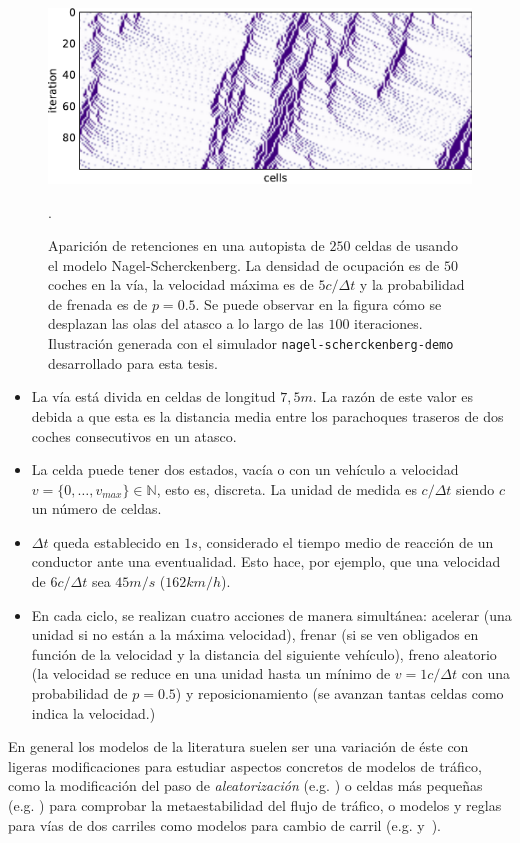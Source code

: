 \begin{figure}
	\centering
	\includegraphics{images/nagel-schreck}
	\caption{Aparición de retenciones en una autopista de $250$ celdas de usando el modelo Nagel-Scherckenberg. La densidad de ocupación es de $50$ coches en la vía, la velocidad máxima es de $5 c/\Delta t$ y la probabilidad de frenada es de $p = 0.5$. Se puede observar en la figura cómo se desplazan las olas del atasco a lo largo de las $100$ iteraciones. Ilustración generada con el simulador \texttt{nagel-scherckenberg-demo} desarrollado para esta tesis.}
	\label{fig:nagel-schreck}
.\end{figure}

\begin{itemize}
	\item La vía está divida en celdas de longitud $7,5m$. La razón de este valor es debida a que esta es la distancia media entre los parachoques traseros de dos coches consecutivos en un atasco.
	\item La celda puede tener dos estados, vacía o con un vehículo a velocidad $v = \{0, \ldots, v_{max}\} \in \mathbb{N}$, esto es, discreta. La unidad de medida es $c/\Delta t$ siendo $c$ un número de celdas.
	\item $\Delta t$ queda establecido en $1s$, considerado el tiempo medio de reacción de un conductor ante una eventualidad. Esto hace, por ejemplo, que una velocidad de $6 c/\Delta t$ sea $45 m/s$ ($162 km/h$).
	\item En cada ciclo, se realizan cuatro acciones de manera simultánea: acelerar (una unidad si no están a la máxima velocidad), frenar (si se ven obligados en función de la velocidad y la distancia del siguiente vehículo), freno aleatorio (la velocidad se reduce en una unidad hasta un mínimo de $v = 1 c/\Delta t$ con una probabilidad de $p = 0.5$) y reposicionamiento (se avanzan tantas celdas como indica la velocidad.)
\end{itemize}

En general los modelos de la literatura suelen ser una variación de éste con ligeras modificaciones para estudiar aspectos concretos de modelos de tráfico, como la modificación del paso de \textit{aleatorización} (e.g. \cite{Barlovic1998}) o celdas más pequeñas (e.g. \cite{Krauss1997}) para comprobar la metaestabilidad del flujo de tráfico, o modelos y reglas para vías de dos carriles como modelos para cambio de carril (e.g. \cite{Brilon1999} y~\cite{Nagel1998}).

